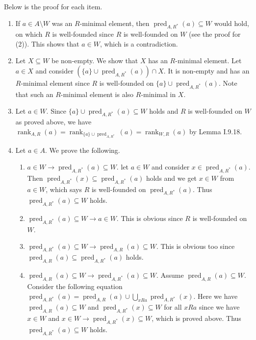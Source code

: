 \documentclass[12pt]{article}
\newcommand{\pred}{\mathop{\mathrm{pred}}}
\newcommand{\rank}{\mathop{\mathrm{rank}}}
\theoremstyle{definition}
\newenvironment{customthm}[1]
  {\renewcommand\theinnercustomthm{#1}\innercustomthm}
  {\endinnercustomthm}
\begin{document}
\begin{customthm}{I.9.46}
  Below is the proof for each item.
  \begin{enumerate}[label=\arabic*.]
    \item If $a\in A\setminus W$ was an $R$-minimal element, then $\pred_{A,R^*}(a)\subseteq W$ would hold, on which $R$ is well-founded since $R$ is well-founded on $W$ (see the proof for (2)). This shows that $a\in W$, which is a contradiction.
    \item Let $X\subseteq W$ be non-empty. We show that $X$ has an $R$-minimal element. Let $a\in X$ and consider $(\{a\}\cup\pred_{A,R^*}(a))\cap X$. It is non-empty and has an $R$-minimal element since $R$ is well-founded on $\{a\}\cup\pred_{A,R^*}(a)$. Note that such an $R$-minimal element is also $R$-minimal in $X$.
    \item Let $a\in W$. Since $\{a\}\cup\pred_{A,R^*}(a)\subseteq W$ holds and $R$ is well-founded on $W$ as proved above, we have $\rank_{A,R}(a)=\rank_{\{a\}\cup\pred_{A,R^*}}(a)=\rank_{W,R}(a)$ by Lemma I.9.18.
    \item Let $a\in A$. We prove the following.
    \begin{enumerate}
      \item\underline{$a\in W\rightarrow\pred_{A,R^*}(a)\subseteq W$}. let $a\in W$ and consider $x\in\pred_{A,R^*}(a)$. Then $\pred_{A,R^*}(x)\subseteq \pred_{A,R^*}(a)$ holds and we get $x\in W$ from $a\in W$, which says $R$ is well-founded on $\pred_{A,R^*}(a)$. Thus $\pred_{A,R^*}(a)\subseteq W$ holds.
      \item\underline{$\pred_{A,R^*}(a)\subseteq W\rightarrow a\in W$}. This is obvious since $R$ is well-founded on $W$.
      \item\underline{$\pred_{A,R^*}(a)\subseteq W\rightarrow\pred_{A,R}(a)\subseteq W$}. This is obvious too since $\pred_{A,R}(a)\subseteq\pred_{A,R^*}(a)$ holds.
      \item\underline{$\pred_{A,R}(a)\subseteq W\rightarrow\pred_{A,R^*}(a)\subseteq W$}. Assume $\pred_{A,R}(a)\subseteq W$. Consider the following equation $\pred_{A,R^*}(a)=\pred_{A,R}(a)\cup\bigcup_{xRa}\pred_{A,R^*}(x)$. Here we have $\pred_{A,R}(a)\subseteq W$ and $\pred_{A,R^*}(x)\subseteq W$ for all $xRa$ since we have $x\in W$ and $x\in W\rightarrow\pred_{A,R^*}(x)\subseteq W$, which is proved above. Thus $\pred_{A,R^*}(a)\subseteq W$ holds.
    \end{enumerate}
  \end{enumerate}
\end{customthm}
\end{document}
